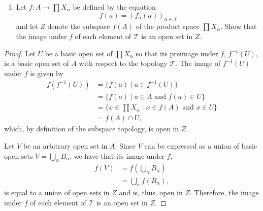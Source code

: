 \documentclass[a4paper,10pt]{article}
\newcommand{\inv}{^{-1}}
\begin{document}
\begin{solution}
    \begin{enumerate}[label={(\alph*)}, align=left, leftmargin=\parindent, listparindent=\parindent, labelwidth=0pt, itemindent=!]
        \addtocounter{enumi}{3} 
        \item Let $f: A \rightarrow \prod X_\alpha$ be defined by the equation
        \begin{equation*}
            f(a) = (f_\alpha(a))_{\alpha \in J}
        \end{equation*}
        and let $Z$ denote the subspace $f(A)$ of the product space $\prod X_\alpha$.
        Show that the image under $f$ of each element of $\mathcal{T}$ is an open set in $Z$.
    \end{enumerate}
    \begin{proof}
        Let $U$ be a basic open set of $\prod X_\alpha$ so that its preimage under $f$, $f\inv(U)$, is a basic open set of $A$ with respect to the topology $\mathcal{T}$.
        The image of $f\inv(U)$ under $f$ is given by
        \begin{align*}
            f(f\inv(U)) &= \{f(a) \mid a \in f\inv(U)\} \\
                        &= \{f(a) \mid a \in A \text{ and } f(a) \in U\} \\
                        &= \{x \in \prod X_\alpha \mid x \in f(A) \text{ and } x \in U\} \\
                        &= f(A) \cap U,
        \end{align*}
        which, by definition of the subspace topology, is open in $Z$.

        Let $V$ be an arbitrary open set in $A$.
        Since $V$ can be expressed as a union of basic open sets $V = \bigcup_\alpha B_\alpha$, we have that its image under $f$,
        \begin{align*}
            f(V)    &= f(\bigcup_\alpha B_\alpha) \\
                    &= \bigcup_\alpha f(B_\alpha),
        \end{align*}
        is equal to a union of open sets in $Z$ and is, thus, open in $Z$.
        Therefore, the image under $f$ of each element of $\mathcal{T}$ is an open set in $Z$.
    \end{proof}
\end{solution}
\newpage
\end{document}
